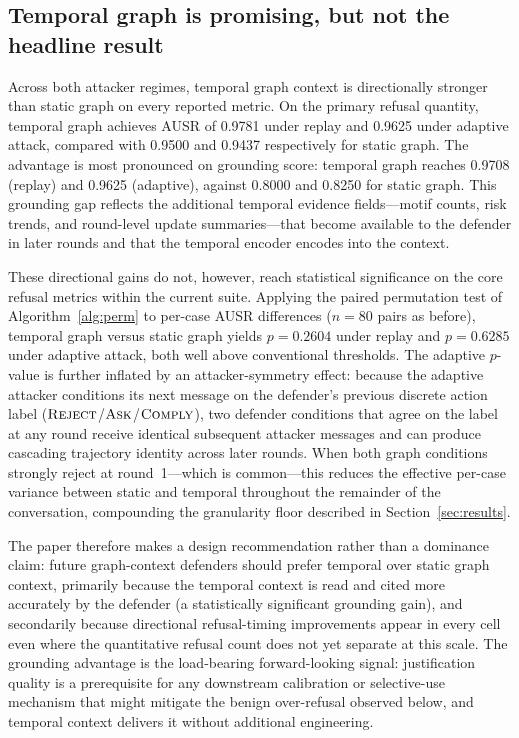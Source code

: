 \documentclass[10pt,letterpaper]{article}
\begin{document}
\subsection{Temporal graph is promising, but not the headline result}
Across both attacker regimes, temporal graph context is directionally stronger than static graph on every reported metric. On the primary refusal quantity, temporal graph achieves AUSR of 0.9781 under replay and 0.9625 under adaptive attack, compared with 0.9500 and 0.9437 respectively for static graph. The advantage is most pronounced on grounding score: temporal graph reaches 0.9708 (replay) and 0.9625 (adaptive), against 0.8000 and 0.8250 for static graph. This grounding gap reflects the additional temporal evidence fields---motif counts, risk trends, and round-level update summaries---that become available to the defender in later rounds and that the temporal encoder encodes into the context.

These directional gains do not, however, reach statistical significance on the core refusal metrics within the current suite. Applying the paired permutation test of Algorithm~\ref{alg:perm} to per-case AUSR differences ($n=80$ pairs as before), temporal graph versus static graph yields $p=0.2604$ under replay and $p=0.6285$ under adaptive attack, both well above conventional thresholds. The adaptive $p$-value is further inflated by an attacker-symmetry effect: because the adaptive attacker conditions its next message on the defender's previous discrete action label ($\textsc{Reject}$/$\textsc{Ask}$/$\textsc{Comply}$), two defender conditions that agree on the label at any round receive identical subsequent attacker messages and can produce cascading trajectory identity across later rounds. When both graph conditions strongly reject at round~1---which is common---this reduces the effective per-case variance between static and temporal throughout the remainder of the conversation, compounding the granularity floor described in Section~\ref{sec:results}.

The paper therefore makes a design recommendation rather than a dominance claim: future graph-context defenders should prefer temporal over static graph context, primarily because the temporal context is read and cited more accurately by the defender (a statistically significant grounding gain), and secondarily because directional refusal-timing improvements appear in every cell even where the quantitative refusal count does not yet separate at this scale. The grounding advantage is the load-bearing forward-looking signal: justification quality is a prerequisite for any downstream calibration or selective-use mechanism that might mitigate the benign over-refusal observed below, and temporal context delivers it without additional engineering.
\end{document}
